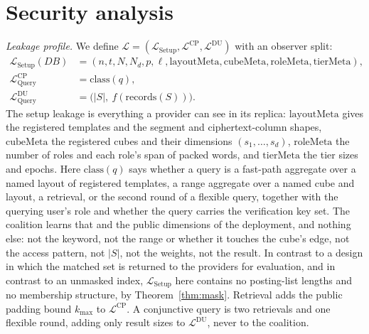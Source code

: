 \documentclass[a4paper,fleqn]{cas-sc}
\newcommand{\Leak}{\mathcal{L}}
\begin{document}
\section{Security analysis}
\label{sec:security}

\emph{Leakage profile.} We define
$\Leak=(\Leak_{\mathrm{Setup}},\Leak^{\text{CP}},\Leak^{\text{DU}})$ with an
observer split:
\begin{align*}
\Leak_{\mathrm{Setup}}(DB) &= (n,t,N,N_d,p,\ell,\mathrm{layoutMeta},\mathrm{cubeMeta},\mathrm{roleMeta},\mathrm{tierMeta}),\\
\Leak^{\text{CP}}_{\mathrm{Query}} &= \mathrm{class}(q),\\
\Leak^{\text{DU}}_{\mathrm{Query}} &= \big(|S|,\ f(\mathrm{records}(S))\big).
\end{align*}
The setup leakage is everything a provider can see in its replica:
$\mathrm{layoutMeta}$ gives the registered templates and the segment and
ciphertext-column shapes, $\mathrm{cubeMeta}$ the registered cubes and their
dimensions $(s_1,\dots,s_d)$, $\mathrm{roleMeta}$ the number of roles and each
role's span of packed words, and $\mathrm{tierMeta}$ the tier sizes and epochs.
Here $\mathrm{class}(q)$ says whether a query is a fast-path aggregate over a
named layout of registered templates, a range aggregate over a named cube and
layout, a retrieval, or the second round of a flexible query, together with
the querying user's role and whether the query carries the verification key
set. The coalition
learns that and the public dimensions of the deployment, and nothing else: not
the keyword, not the range or whether it touches the cube's edge, not the
access pattern, not $|S|$, not the weights, not the result. In contrast to a design in which
the matched set is returned to the providers for evaluation, and in contrast
to an unmasked index, $\Leak_{\mathrm{Setup}}$ here contains no posting-list
lengths and no membership structure, by Theorem~\ref{thm:mask}. Retrieval adds
the public padding bound $k_{\max}$ to $\Leak^{\text{CP}}$. A conjunctive
query is two retrievals and one flexible round, adding only result sizes to
$\Leak^{\text{DU}}$, never to the coalition.
\end{document}
